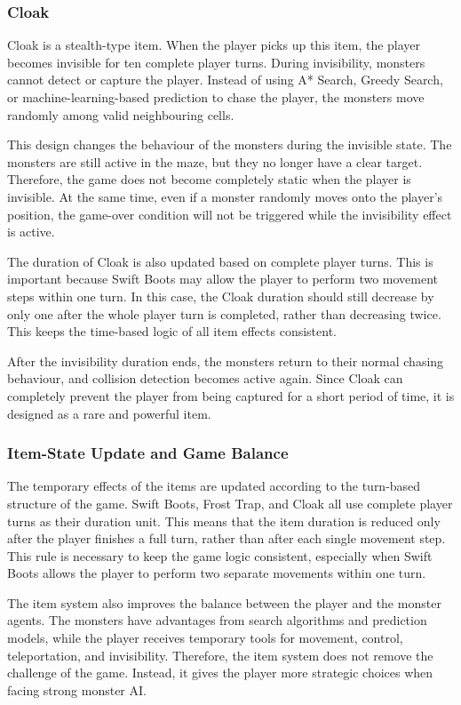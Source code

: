 \subsubsection{Cloak}

Cloak is a stealth-type item. When the player picks up this item, the player becomes invisible for ten complete player turns. During invisibility, monsters cannot detect or capture the player. Instead of using A* Search, Greedy Search, or machine-learning-based prediction to chase the player, the monsters move randomly among valid neighbouring cells.

This design changes the behaviour of the monsters during the invisible state. The monsters are still active in the maze, but they no longer have a clear target. Therefore, the game does not become completely static when the player is invisible. At the same time, even if a monster randomly moves onto the player’s position, the game-over condition will not be triggered while the invisibility effect is active.

The duration of Cloak is also updated based on complete player turns. This is important because Swift Boots may allow the player to perform two movement steps within one turn. In this case, the Cloak duration should still decrease by only one after the whole player turn is completed, rather than decreasing twice. This keeps the time-based logic of all item effects consistent.

After the invisibility duration ends, the monsters return to their normal chasing behaviour, and collision detection becomes active again. Since Cloak can completely prevent the player from being captured for a short period of time, it is designed as a rare and powerful item.

\subsubsection{Item-State Update and Game Balance}

The temporary effects of the items are updated according to the turn-based structure of the game. Swift Boots, Frost Trap, and Cloak all use complete player turns as their duration unit. This means that the item duration is reduced only after the player finishes a full turn, rather than after each single movement step. This rule is necessary to keep the game logic consistent, especially when Swift Boots allows the player to perform two separate movements within one turn.

The item system also improves the balance between the player and the monster agents. The monsters have advantages from search algorithms and prediction models, while the player receives temporary tools for movement, control, teleportation, and invisibility. Therefore, the item system does not remove the challenge of the game. Instead, it gives the player more strategic choices when facing strong monster AI.

